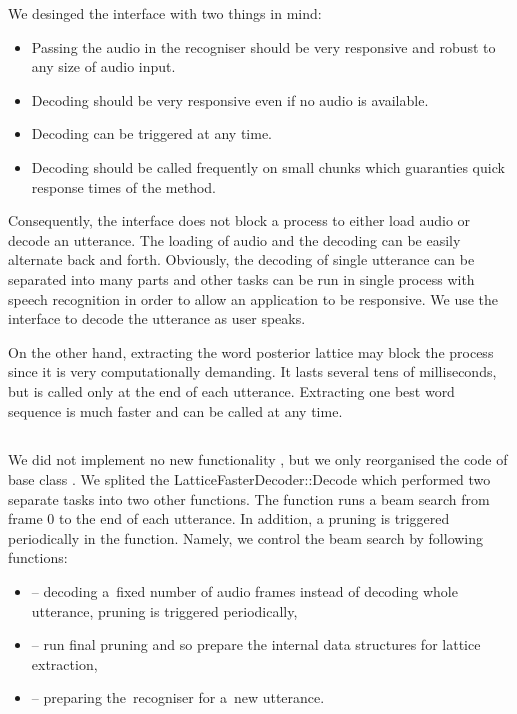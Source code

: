 
We desinged the interface with two things in mind:
\begin{itemize}
    \item Passing the audio in the recogniser should be very responsive and robust to any size of audio input.
    \item Decoding should be very responsive even if no audio is available.
    \item Decoding can be triggered at any time.
    \item Decoding should be called frequently on small chunks which guaranties quick response times of the  method.
\end{itemize}

Consequently, the interface does not block a process to either load audio or decode an utterance.
The loading of audio and the decoding can be easily alternate back and forth.
Obviously, the decoding of single utterance can be separated into many parts and other tasks can be run in single process with speech recognition in order to allow an application to be responsive.
We use the interface to decode the utterance as user speaks.

On the other hand, extracting the word posterior lattice may block the process since it is very computationally demanding.
It lasts several tens of milliseconds, but is called only at the end of each utterance.
Extracting one best word sequence is much faster and can be called at any time.

\subsection{}
\label{sub:dec}
We did not implement no new functionality , but we only reorganised the code of base class .
We splited the LatticeFasterDecoder::Decode which performed two separate tasks into two other functions.
The  function runs a beam search from frame 0 to the end of each utterance.
In addition, a pruning is triggered periodically in the function.
Namely, we control the beam search by following functions: 
\begin{itemize}
\item {} -- decoding a~fixed number of audio frames instead of decoding whole utterance, pruning is triggered periodically,
\item {} -- run final pruning and so prepare the internal data structures for lattice extraction,
\item {} -- preparing the~recogniser for a~new utterance.
\end{itemize}

